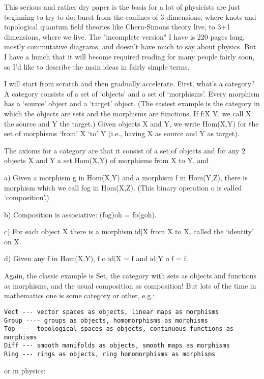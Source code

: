 This serious and rather dry paper is the basis for a lot of 
physicists are just beginning to try to do: burst from the confines of 3
dimensions, where knots and topological quantum field theories like
Chern-Simons theory live, to 3+1 dimensions, where we live.  The
"incomplete version" I have is 220 pages long, mostly commutative
diagrams, and doesn't have much to say about physics.  But I have a hunch
that it will become required reading for many people fairly soon, so 
I'd like to describe the main ideas in fairly simple terms.  

I will start from scratch and then gradually accelerate.  First, what's
a category?  A category consists of a set of `objects' and a set of
`morphisms'.  Every morphism has a `source' object and a `target'
object.  (The easiest example is the category in which the objects
are sets and the morphisms are functions.  If f:X \to  Y, we call X the
source and Y the target.)  Given objects X and Y, we write Hom(X,Y)
for the set of morphisms `from' X `to' Y (i.e., having X as source and Y
as target).  

The axioms for a category are that it consist of a set of objects and
for any 2 objects X and Y a set Hom(X,Y) of morphisms from X to Y, and

a)  Given a morphism g in Hom(X,Y) and a morphism f in Hom(Y,Z), there
is morphism which we call fog in Hom(X,Z).  (This binary operation o is
called `composition'.)

b)  Composition is associative:  (fog)oh = fo(goh).

c)  For each object X there is a morphism id|X from X to X, called the
`identity' on X.

d)  Given any f in Hom(X,Y), f o id|X = f and id|Y o f = f.

Again, the classic example is Set, the category with sets as objects and
functions as morphisms, and the usual composition as composition!
But lots of the time in mathematics one is some category or other, e.g.:

\begin{verbatim}
Vect --- vector spaces as objects, linear maps as morphisms
Group ---- groups as objects, homomorphisms as morphisms
Top ---  topological spaces as objects, continuous functions as morphisms
Diff --- smooth manifolds as objects, smooth maps as morphisms
Ring --- rings as objects, ring homomorphisms as morphisms
\end{verbatim}
    

or in physics:

